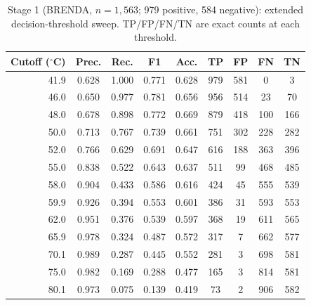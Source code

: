 \documentclass[journal,article,submit,moreauthors]{Definitions/mdpi}
\begin{document}
\begin{table}[H]
\caption{Stage 1 (BRENDA, $n=1{,}563$; 979 positive, 584 negative): extended
decision-threshold sweep. TP/FP/FN/TN are exact counts at each threshold.}
\label{tab:sweep1}
\begin{tabular}{rcccccccc}
\toprule
\textbf{Cutoff ($^{\circ}$C)} & \textbf{Prec.} & \textbf{Rec.} & \textbf{F1} & \textbf{Acc.} & \textbf{TP} & \textbf{FP} & \textbf{FN} & \textbf{TN}\\
\midrule
41.9 & 0.628 & 1.000 & 0.771 & 0.628 & 979 & 581 & 0   & 3\\
46.0 & 0.650 & 0.977 & 0.781 & 0.656 & 956 & 514 & 23  & 70\\
48.0 & 0.678 & 0.898 & 0.772 & 0.669 & 879 & 418 & 100 & 166\\
50.0 & 0.713 & 0.767 & 0.739 & 0.661 & 751 & 302 & 228 & 282\\
52.0 & 0.766 & 0.629 & 0.691 & 0.647 & 616 & 188 & 363 & 396\\
55.0 & 0.838 & 0.522 & 0.643 & 0.637 & 511 & 99  & 468 & 485\\
58.0 & 0.904 & 0.433 & 0.586 & 0.616 & 424 & 45  & 555 & 539\\
59.9 & 0.926 & 0.394 & 0.553 & 0.601 & 386 & 31  & 593 & 553\\
62.0 & 0.951 & 0.376 & 0.539 & 0.597 & 368 & 19  & 611 & 565\\
65.9 & 0.978 & 0.324 & 0.487 & 0.572 & 317 & 7   & 662 & 577\\
70.1 & 0.989 & 0.287 & 0.445 & 0.552 & 281 & 3   & 698 & 581\\
75.0 & 0.982 & 0.169 & 0.288 & 0.477 & 165 & 3   & 814 & 581\\
80.1 & 0.973 & 0.075 & 0.139 & 0.419 & 73  & 2   & 906 & 582\\
\bottomrule
\end{tabular}
\end{table}
\end{document}
